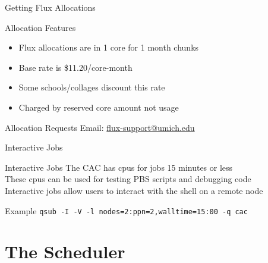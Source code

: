 \documentclass[handout]{beamer}
\begin{document}
\begin{frame}{Getting Flux Allocations}
 \begin{block}{Allocation Features}
  \begin{itemize}
   \item Flux allocations are in 1 core for 1 month chunks
   \item Base rate is \$11.20/core-month
   \item Some schools/collages discount this rate
   \item Charged by reserved core amount not usage
  \end{itemize}
 \end{block}
 \begin{block}{Allocation Requests}
  Email: \url{flux-support@umich.edu}
 \end{block}
\end{frame}

\begin{frame}{Interactive Jobs}
 \begin{block}{Interactive Jobs}
   {The CAC has cpus for jobs 15 minutes or less \\}
   {These cpus can be used for testing PBS scripts and debugging code \\}
   {Interactive jobs allow users to interact with the shell on a remote node \\}
 \end{block}
 \begin{block}{Example}
   {\texttt{qsub -I -V -l nodes=2:ppn=2,walltime=15:00 -q cac}}
 \end{block}
\end{frame}

\section{The Scheduler}
\end{document}
